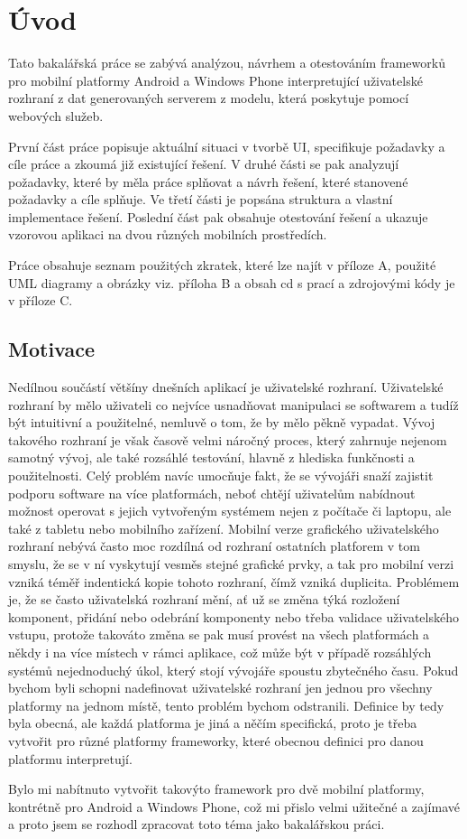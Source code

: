 \chapter{Úvod}
Tato bakalářská práce se zabývá analýzou, návrhem a otestováním frameworků pro mobilní platformy Android a Windows Phone interpretující uživatelské rozhraní z dat generovaných serverem z modelu, která poskytuje pomocí webových služeb.

První část práce popisuje aktuální situaci v tvorbě UI, specifikuje požadavky a cíle práce a zkoumá již existující řešení. V druhé části se pak analyzují požadavky, které by měla práce splňovat a návrh řešení, které stanovené požadavky a cíle splňuje. Ve třetí části je popsána struktura a vlastní implementace řešení. Poslední část pak obsahuje otestování řešení a ukazuje vzorovou aplikaci na dvou různých mobilních prostředích.

Práce obsahuje seznam použitých zkratek, které lze najít v příloze A, použité UML diagramy a obrázky viz. příloha B a obsah cd s prací a zdrojovými kódy je v příloze C.
 

\section{Motivace}
Nedílnou součástí většíny dnešních aplikací je uživatelské rozhraní. Uživatelské rozhraní by mělo uživateli co nejvíce usnadňovat manipulaci se softwarem a tudíž být intuitivní a použitelné, nemluvě o tom, že by mělo pěkně vypadat. Vývoj takového rozhraní je však časově velmi náročný proces, který zahrnuje nejenom samotný vývoj, ale také rozsáhlé testování, hlavně z hlediska funkčnosti a použitelnosti. Celý problém navíc umocňuje fakt, že se vývojáři snaží zajistit podporu software na více platformách, neboť chtějí uživatelům nabídnout možnost operovat s jejich vytvořeným systémem nejen z počítače či laptopu, ale také z tabletu nebo mobilního zařízení. Mobilní verze grafického uživatelského rozhraní nebývá často moc rozdílná od rozhraní ostatních platforem v tom smyslu, že se v ní vyskytují vesměs stejné grafické prvky, a tak pro mobilní verzi vzniká téměř indentická kopie tohoto rozhraní, čímž vzniká duplicita. Problémem je, že se často uživatelská rozhraní mění, ať už se změna týká rozložení komponent, přidání nebo odebrání komponenty nebo třeba validace uživatelského vstupu, protože takováto změna se pak musí provést na všech platformách a někdy i na více místech v rámci aplikace, což může být v případě rozsáhlých systémů nejednoduchý úkol, který stojí vývojáře spoustu zbytečného času. Pokud bychom byli schopni nadefinovat uživatelské rozhraní jen jednou pro všechny platformy na jednom místě, tento problém bychom odstranili. Definice by tedy byla obecná, ale každá platforma je jiná a něčím specifická, proto je třeba vytvořit pro různé platformy frameworky, které obecnou definici pro danou platformu interpretují. 

Bylo mi nabítnuto vytvořit takovýto framework pro dvě mobilní platformy, kontrétně pro Android a Windows Phone, což mi přislo velmi užitečné a zajímavé a proto jsem se rozhodl zpracovat toto téma jako bakalářskou práci.
